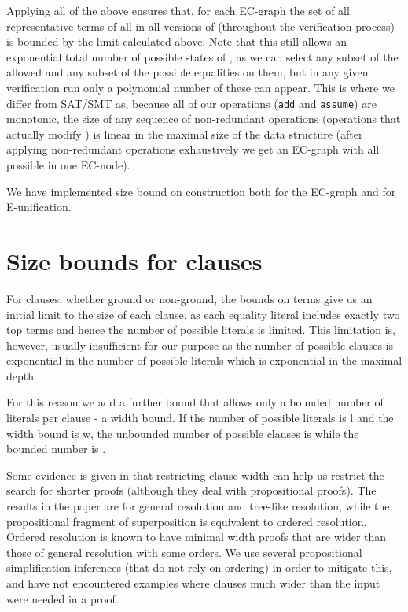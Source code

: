 Applying all of the above ensures that, for each EC-graph  the set of all representative terms of all \GFAs{} in all versions of  (throughout the verification process) is bounded by the limit calculated above.
Note that this still allows an exponential total number of possible states of , as we can select any subset of the allowed \GFAs{} and any subset of the possible equalities on them, but in any given verification run only a polynomial number of these can appear. This is where we differ from SAT/SMT as, because all of our operations (\lstinline|add| and \lstinline|assume|) are monotonic, the size of any sequence of non-redundant operations (operations that actually modify ) is linear in the maximal size of the data structure (after applying non-redundant operations exhaustively we get an EC-graph with all possible \GFAs{} in one EC-node).

We have implemented size bound on construction both for the EC-graph and for E-unification.

\section{Size bounds for clauses}
For clauses, whether ground or non-ground, the bounds on terms give us an initial limit to the size of each clause, as each equality literal includes exactly two top terms and hence the number of possible literals is limited. This limitation is, however, usually insufficient for our purpose as the number of possible clauses is exponential in the number of possible literals which is exponential in the maximal depth.

For this reason we add a further bound that allows only a bounded number of literals per clause - a width bound. 
If the number of possible literals is l and the width bound is w, the unbounded number of possible clauses is  while the bounded number is .

Some evidence is given in \cite{DBLP:journals/jacm/Ben-SassonW01} that restricting clause width can help us restrict the search for shorter proofs (although they deal with propositional proofs). The results in the paper are for general resolution and tree-like resolution, while the propositional fragment of superposition is equivalent to ordered resolution. 
Ordered resolution is known to have minimal width proofs that are wider than those of general resolution with some orders.
We use several propositional simplification inferences (that do not rely on ordering) in order to mitigate this, and have not encountered examples where clauses much wider than the input were needed in a proof. 

